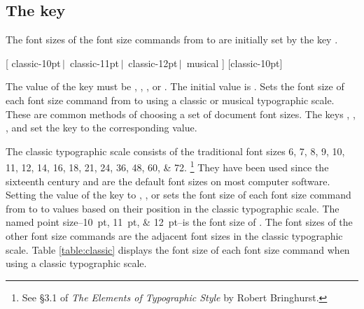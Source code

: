 \documentclass{beery}
\begin{document}
\subsection
  {%
    The key
    \texorpdfstring
      {}
      {typographic-scale}%
  }
\label{subsec:typographicscale}

The font sizes of the font size commands from  to  are initially set by the key .

\begin{mydisplaycode}
    [
      classic-10pt$\,\vert\,$\allowbreak
      classic-11pt$\,\vert\,$\allowbreak
      classic-12pt$\,\vert\,$\allowbreak\hspace*{1.5em}%
      musical
    ]
    [classic-10pt]
  \newline
  \newline
  \newline
  \nopagebreak\newline
\end{mydisplaycode}

The value of the key  must be , , , or .
The initial value is .
Sets the font size of each font size command from  to  using a classic or musical typographic scale.
These are common methods of choosing a set of document font sizes.
The keys , , , and  set the key  to the corresponding value.

The classic typographic scale consists of the traditional font sizes
\numlist{6;7;8;9;10;11;12;14;16;18;21;24;36;48;60;72}.%
\footnote{See \S3.1 of \textit{The Elements of Typographic Style} by Robert Bringhurst.}
They have been used since the sixteenth century and are the default font sizes on most computer software.
Setting the value of the key  to , , or  sets the font size of each font size command from  to  to values based on their position in the classic typographic scale.
The named point size\---\qtylist[list-final-separator={, or }]{10;11;12}{pt}\---is the font size of .
The font sizes of the other font size commands are the adjacent font sizes in the classic typographic scale.
Table \ref{table:classic} displays the font size of each font size command when using a classic typographic scale.
\end{document}
